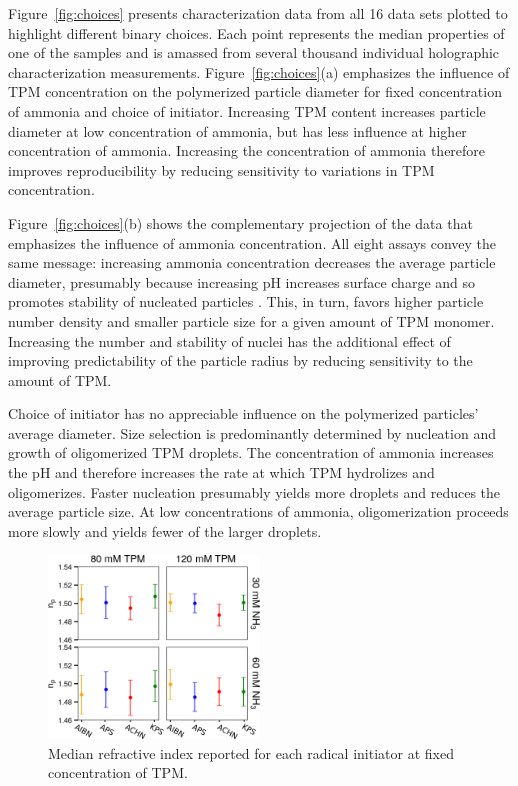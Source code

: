 \documentclass[journal=langd5,manuscript=article]{achemso}
\begin{document}
Figure~\ref{fig:choices} presents
characterization data from all \num{16} data sets plotted to highlight different
binary choices.
Each point represents the median properties of
one of the samples and is amassed 
from several thousand
individual holographic characterization measurements.
Figure~\ref{fig:choices}(a) 
emphasizes the influence of TPM concentration
on the polymerized particle diameter
for fixed concentration of 
ammonia and choice 
of initiator.
Increasing TPM content increases particle
diameter at low concentration of ammonia,
but has less influence at higher concentration
of ammonia.
Increasing the concentration of 
ammonia
therefore improves reproducibility by 
reducing sensitivity to variations in TPM concentration.

Figure~\ref{fig:choices}(b) shows the complementary projection
of the data that emphasizes the influence of
ammonia concentration. 
All eight assays convey the same message:
increasing ammonia concentration
decreases the average particle diameter, presumably because
increasing pH increases surface charge and so
promotes stability of nucleated particles \cite{vanderwel17,yeung2003shear}. 
This, in turn, favors higher particle number density 
and smaller particle size for a given amount of TPM monomer.
Increasing the number and stability of nuclei 
has the additional effect of improving predictability
of the particle radius by reducing sensitivity to the amount
of TPM.

Choice of initiator has no appreciable 
influence on the polymerized particles'
average diameter.
Size selection is predominantly 
determined by nucleation and growth of
oligomerized TPM droplets.
The concentration of ammonia increases the pH and
therefore increases the rate at which TPM hydrolizes and oligomerizes.
Faster nucleation
presumably yields more droplets and reduces the average particle size.
At low concentrations of ammonia, 
oligomerization proceeds more slowly
and yields fewer of the larger droplets.

\begin{figure}
    \centering
    \includegraphics[width=0.5\textwidth]{longitudinal_np_02}
    \caption{Median refractive index reported for each radical initiator
    at fixed concentration of TPM.}
    \label{fig:longitudinal_np}
\end{figure}
\end{document}
